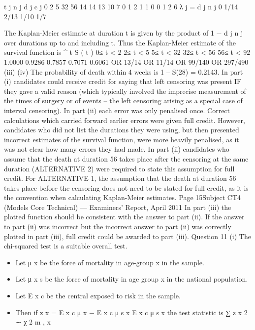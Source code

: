 \documentclass[a4paper,12pt]{article}
\begin{document}
\begin{enumerate}
t j n j d j c j
0
2
5
32
56 14
14
13
10
7 0
1
2
1
1 0
0
1
2
6
λ j =
d j
n j
0
1/14
2/13
1/10
1/7

The Kaplan-Meier estimate at duration t is given by the product of 1 −
d j
n j
over
durations up to and including t. Thus the Kaplan-Meier estimate of the survival
function is
^
t S ( t )
0≤ t < 2
2≤ t < 5
5≤ t < 32
32≤ t < 56
56≤ t < 92 1.0000
0.9286
0.7857
0.7071
0.6061
OR 13/14
OR 11/14
OR 99/140
OR 297/490
(iii)
(iv)
The probability of death within 4 weeks is 1 – S(28) = 0.2143.
In part (i) candidates could receive credit for saying that left censoring was present IF they gave a valid reason (which typically involved the imprecise measurement of the times of surgery or of events – the left censoring arising as a special case of interval censoring).
In part (ii) each error was only penalised once. Correct calculations which carried forward earlier errors were given full credit. However, candidates who did not list the durations they were using, but then presented incorrect estimates of the survival function, were more heavily penalised, as it was not clear how many errors they had made.
In part (ii) candidates who assume that the death at duration 56 takes place after the
censoring at the same duration (ALTERNATIVE 2) were required to state this assumption for full credit. For ALTERNATIVE 1, the assumption that the death at duration 56 takes place before the censoring does not need to be stated for full credit, as it is the convention when
calculating Kaplan-Meier estimates.
Page 15Subject CT4 (Models Core Technical) — Examiners’ Report, April 2011
In part (iii) the plotted function should be consistent with the answer to part (ii). If the answer to part (ii) was incorrect but the incorrect answer to part (ii) was correctly plotted in part (iii), full credit could be awarded to part (iii).
\newpage
Question 11
(i)
The chi-squared test is a suitable overall test.
\begin{itemize}
\item Let μ x be the force of mortality in age-group x in the sample.
\item Let μ x s be the force of mortality in age group x in the national population.
\item Let E x c be the central exposed to risk in the sample.
\item Then if z x =
E x c μ x − E x c μ s x
E x c μ s x
the test statistic is
∑ z x 2 ∼ χ 2 m ,
x
\end{itemize}

\end{enumerate}
\end{document}
